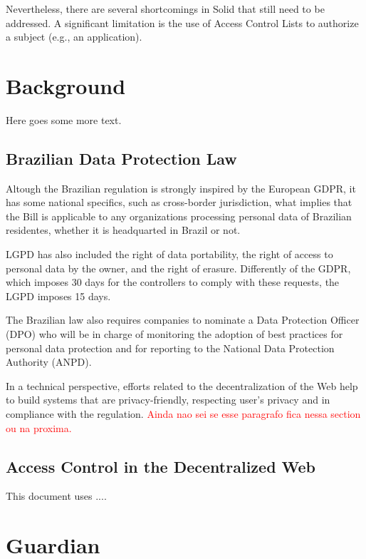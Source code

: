 \documentclass[sigconf]{acmart}
\begin{document}
Nevertheless, there are several shortcomings in Solid that still need to be addressed. A significant limitation is the use of Access Control Lists to authorize a subject (e.g., an application).








\section{Background}
Here goes some more text.

\subsection{Brazilian Data Protection Law}
Altough the Brazilian regulation is strongly inspired by the European GDPR, it has some national specifics, such as cross-border jurisdiction, what implies that the Bill is applicable to any organizations processing personal data of Brazilian residentes, whether it is headquarted in Brazil or not.

LGPD has also included the right of data portability, the right of access to personal data by the owner, and the right of erasure. Differently of the GDPR, which imposes 30 days for the controllers to comply with these requests, the LGPD imposes 15 days.

The Brazilian law also requires companies to nominate a Data Protection Officer (DPO) who will be in charge of monitoring the adoption of best practices for personal data protection and for reporting to the National Data Protection Authority (ANPD).

In a technical perspective, efforts related to the decentralization of the Web help to build systems that are privacy-friendly, respecting user's privacy and in compliance with the regulation.
\textcolor{red}{Ainda nao sei se esse paragrafo fica nessa section ou na proxima.}

\subsection{Access Control in the Decentralized Web}

This document uses ....

\section{Guardian}
\end{document}
